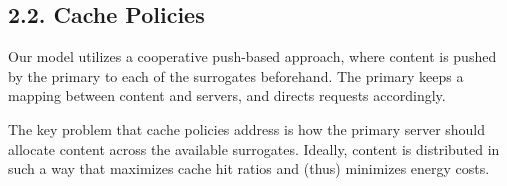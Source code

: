 \documentclass[
	a4paper, %
	10pt, %
	unnumberedsections, %
	twoside, %
]{LTJournalArticle}
\begin{document}


	

\subsection{2.2. Cache Policies}
Our model utilizes a cooperative push-based approach, where content is pushed by the primary to each of the surrogates beforehand. The primary keeps a mapping between content and servers, and directs requests accordingly. 

The key problem that cache policies address is how the primary server should allocate content across the available surrogates. Ideally, content is distributed in such a way that maximizes cache hit ratios and (thus) minimizes energy costs.
\end{document}
